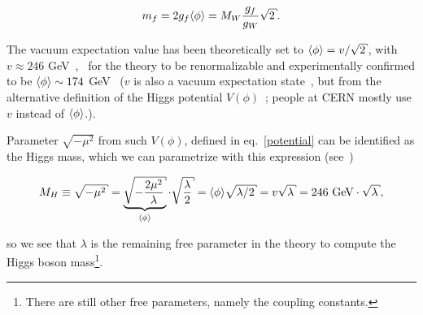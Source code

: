 \begin{equation}
	m_f = 2g_f\vac = M_W\frac{g_f}{g_W}\sqrt{2}. \label{mass:fermions}
\end{equation}

The vacuum expectation value has been theoretically set to $\vac = v/\sqrt{2}$, with $v \approx 246$
GeV~\cite[pg. 1]{higgs:review},~\cite[pg. 21]{elena:green} for the theory to be renormalizable and experimentally confirmed to be
$\langle\phi\rangle \sim 174$ GeV~\cite[pg. 19]{elena:green} ($v$ is also a vacuum expectation state~\cite[pg. 1]{higgs:review}, but
from the alternative definition of the Higgs potential $V(\phi)$~\cite[pg. 267]{perkins}; people at CERN mostly use $v$ instead of
$\langle\phi\rangle$.).

Parameter $\sqrt{-\mu^2}$ from such $V(\phi)$, defined in eq.~\eqref{potential} can be identified as the Higgs mass, which we can
parametrize with this expression \hbox{(see~\cite[pg. 21]{elena:green})}

\begin{equation}
	M_H \equiv \sqrt{-\mu^2} = \underbrace{\sqrt{-\frac{2\mu^2}{\lambda}}}_{\vac} \cdot \sqrt{\frac{\lambda}{2}}
		= \vac\sqrt{\lambda/2} = v\sqrt{\lambda} = 246\text{ GeV} \cdot \sqrt{\lambda}, \label{mass:higgs}
\end{equation}

so we see that $\lambda$ is the remaining free parameter in the theory to compute the Higgs boson mass\footnote{There are
still other free parameters, namely the coupling constants.}.

\vspace{12pt}
